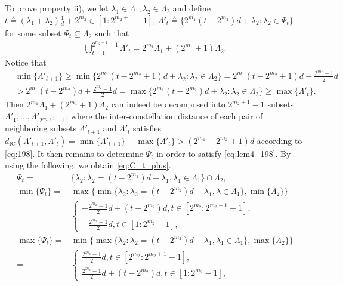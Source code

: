 \documentclass[12pt, draftclsnofoot, onecolumn]{IEEEtran}
\theoremstyle{definition}
\begin{document}
\begin{IEEEproof}
To prove property ii), we let $\lambda_1 \in \Lambda_1,\lambda_2\in \Lambda_2$ and define $t\triangleq (\lambda_1+\lambda_2)\frac{1}{d} + 2^{m_2}\in[1:2^{m_2+1}-1]$, $\Lambda'_t \triangleq \{2^{m_1}(t-2^{m_2})d+\lambda_2 :\lambda_2 \in \Psi_t \}$ for some subset $\Psi_t \subseteq \Lambda_2$ such that
\begin{align}\label{eq:lem4_198}
\bigcup_{t=1}^{2^{m_2+1}-1}\Lambda'_t = 2^{m_1}\Lambda_1+(2^{m_1}+1)\Lambda_2.
\end{align}
Notice that
\begin{align}\label{eq:198}
&\min\{\Lambda'_{t+1}\} \geq \min \{2^{m_1}(t-2^{m_2}+1)d+\lambda_2 :\lambda_2 \in \Lambda_2 \} =2^{m_1}(t-2^{m_2}+1)d-\frac{2^{m_2}-1}{2}d \nonumber \\
&> 2^{m_1}(t-2^{m_2})d+\frac{2^{m_2}-1}{2}d = \max \{2^{m_1}(t-2^{m_2})d+\lambda_2 :\lambda_2 \in \Lambda_2 \} \geq \max\{\Lambda'_t\}.
\end{align}
Then $2^{m_1}\Lambda_1+(2^{m_1}+1)\Lambda_2$ can indeed be decomposed into $2^{m_2+1}-1$ subsets $\Lambda'_{1},\ldots,\Lambda'_{2^{m_2+1}-1}$, where the inter-constellation distance of each pair of neighboring subsets $\Lambda'_{t+1}$ and $\Lambda'_{t}$ satisfies $d_{\text{IC}}(\Lambda'_{t+1},\Lambda'_{t}) = \min\{\Lambda'_{t+1}\}- \max\{\Lambda'_t\} > (2^{m_1}-2^{m_2}+1)d$ according to \eqref{eq:198}.
It then remains to determine $\Psi_t$ in order to satisfy \eqref{eq:lem4_198}. By using the following, we obtain \eqref{eq:C_t_plus}.
\begin{align}
\Psi_t= & \{\lambda_2:\lambda_2 =(t-2^{m_2})d - \lambda_1,\lambda_1 \in \Lambda_1\}  \cap \Lambda_2,\label{phi1}\\
\min\{\Psi_t\} = & \max\{\min\{\lambda_2:\lambda_2=(t-2^{m_2})d-\lambda_1,\lambda \in\Lambda_1\},\min\{\Lambda_2\} \} \nonumber \\
=& \left\{\begin{array}{ll}-\frac{2^{m_2}-1}{2}d+(t-2^{m_2})d,t \in[2^{m_2} :2^{m_2+1}-1],\\
-\frac{2^{m_2}-1}{2}d,t \in[1 :2^{m_2}-1],
\end{array}\right. \label{phi2}\\
\max\{\Psi_t\} = & \min\{\max\{\lambda_2:\lambda_2 =(t-2^{m_2})d - \lambda_1,\lambda_1 \in \Lambda_1\},\max \{\Lambda_2\}\}\nonumber \\
=& \left\{\begin{array}{ll}\frac{2^{m_2}-1}{2}d,t \in[2^{m_2} :2^{m_2+1}-1],\\
\frac{2^{m_2}-1}{2}d+(t-2^{m_2})d,t \in[1 :2^{m_2}-1],

\end{array}
\end{align}
\end{IEEEproof}
\end{document}
